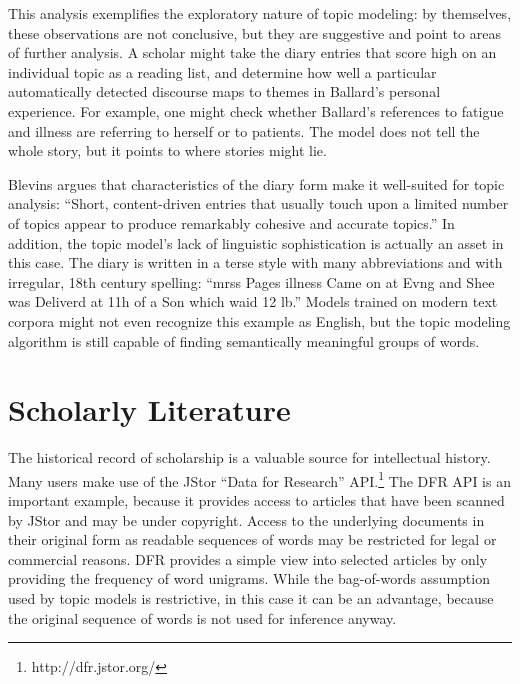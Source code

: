 This analysis exemplifies the exploratory nature of topic modeling: by themselves, these observations are not conclusive, but they are suggestive and point to areas of further analysis.
A scholar might take the diary entries that score high on an individual topic as a reading list, and determine how well a particular automatically detected discourse maps to themes in Ballard's personal experience.
For example, one might check whether Ballard's references to fatigue and illness are referring to herself or to patients.
The model does not tell the whole story, but it points to where stories might lie.

Blevins argues that characteristics of the diary form make it well-suited for topic analysis: ``Short, content-driven entries that usually touch upon a limited number of topics appear to produce remarkably cohesive and accurate topics.''
In addition, the topic model's lack of linguistic sophistication is actually an asset in this case.
The diary is written in a terse style with many abbreviations and with irregular, 18th century spelling: ``mrss Pages illness Came on at Evng and Shee was Deliverd at 11h of a Son which waid 12 lb.''
Models trained on modern text corpora might not even recognize this example as English, but the topic modeling algorithm is still capable of finding semantically meaningful groups of words.



\section{Scholarly Literature}



The historical record of scholarship is a valuable source for intellectual history.
Many users make use of the JStor ``Data for Research'' API.\footnote{http://dfr.jstor.org/}
The DFR API is an important example, because it provides access to articles that have been scanned by JStor and may be under copyright.
Access to the underlying documents in their original form as readable sequences of words may be restricted for legal or commercial reasons.
DFR provides a simple view into selected articles by only providing the frequency of word unigrams.
While the bag-of-words assumption used by topic models is restrictive, in this case it can be an advantage, because the original sequence of words is not used for inference anyway.

